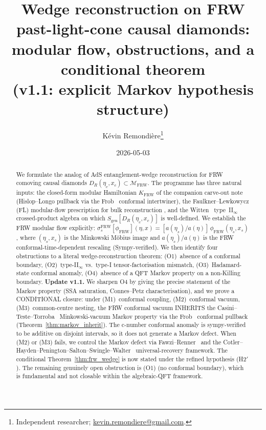 \documentclass[11pt,a4paper]{article}
\title{Wedge reconstruction on FRW past-light-cone causal diamonds:\\
       modular flow, obstructions, and a conditional theorem\\
       \large (v1.1: explicit Markov hypothesis structure)}
\author{K\'evin Remondi\`ere\thanks{Independent researcher; \href{mailto:kevin.remondiere@gmail.com}{kevin.remondiere@gmail.com}.}}
\date{2026-05-03}
\theoremstyle{remark}
\newcommand{\FRW}{{\mathrm{FRW}}}
\newcommand{\Sgen}{S_{\mathrm{gen}}}
\newcommand{\KFRW}{K_{\FRW}}
\newcommand{\DR}{D_R(\eta_c,x_c)}
\newcommand{\sigmats}{\sigma_s^{\FRW}}
\begin{document}
\maketitle

\begin{abstract}
We formulate the analog of AdS entanglement-wedge reconstruction for
FRW comoving causal diamonds $\DR \subset \mathcal{M}_{\FRW}$.
The programme has three natural inputs: the closed-form modular Hamiltonian
$\KFRW$ of the companion carve-out note (Hislop--Longo pullback via the
Frob~\cite{Frob2023} conformal intertwiner), the Faulkner--Lewkowycz (FL)
modular-flow prescription for bulk reconstruction
\cite{FaulknerLewkowycz2017}, and the Witten~\cite{Witten2022}
type~II$_\infty$ crossed-product algebra on which $\Sgen[\DR]$ is
well-defined.
We establish the FRW modular flow explicitly:
$\sigmats[\phi_{\FRW}](\eta,x) = [a(\eta_s)/a(\eta)]\,\phi_{\FRW}(\eta_s,x_s)$,
where $(\eta_s,x_s)$ is the Minkowski M\"obius image and $a(\eta_s)/a(\eta)$
is the FRW conformal-time-dependent rescaling (Sympy-verified).
We then identify four obstructions to a literal wedge-reconstruction
theorem: (O1)~absence of a conformal boundary, (O2)~type-II$_\infty$ vs.\
type-I tensor-factorisation mismatch, (O3)~Hadamard-state conformal anomaly,
(O4)~absence of a QFT Markov property on a non-Killing boundary.
\textbf{Update v1.1.}  We sharpen O4 by giving the precise statement of the
Markov property (SSA saturation, Connes--Petz characterisation), and we
prove a CONDITIONAL closure: under (M1)~conformal coupling, (M2)~conformal
vacuum, (M3)~common-centre nesting, the FRW conformal vacuum INHERITS the
Casini--Teste--Torroba~\cite{CTT2017} Minkowski-vacuum Markov property via
the Frob~\cite{Frob2023} conformal pullback (Theorem~\ref{thm:markov_inherit}).
The c-number conformal anomaly is sympy-verified to be additive on disjoint
intervals, so it does not generate a Markov defect.  When (M2) or (M3)
fails, we control the Markov defect via Fawzi--Renner~\cite{FawziRenner2015}
and the Cotler--Hayden--Penington--Salton--Swingle--Walter~\cite{CHPSSW2017}
universal-recovery framework.
The conditional Theorem~\ref{thm:frw_wedge} is now stated under the refined
hypothesis (H2$'$).  The remaining genuinely open obstruction is (O1) (no
conformal boundary), which is fundamental and not closable within the
algebraic-QFT framework.
\end{abstract}

\tableofcontents

\end{document}
